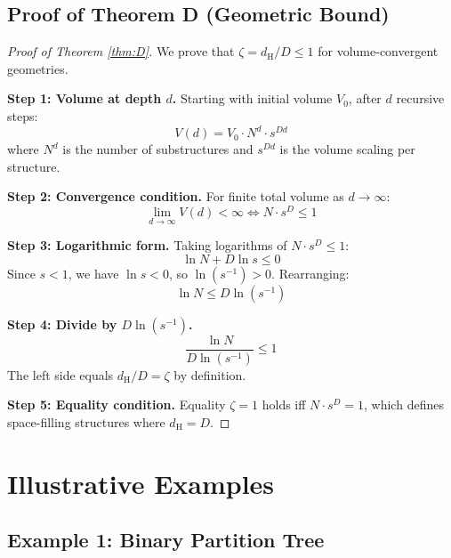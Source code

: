 \documentclass[11pt,a4paper]{article}
\theoremstyle{definition}
\theoremstyle{remark}
\newcommand{\dH}{d_{\mathrm{H}}}
\begin{document}
\subsection{Proof of Theorem D (Geometric Bound)}

\begin{proof}[Proof of Theorem \ref{thm:D}]
We prove that $\zeta = \dH/D \leq 1$ for volume-convergent geometries.

\textbf{Step 1: Volume at depth $d$.}
Starting with initial volume $V_0$, after $d$ recursive steps:
\begin{equation}
    V(d) = V_0 \cdot N^d \cdot s^{Dd}
\end{equation}
where $N^d$ is the number of substructures and $s^{Dd}$ is the volume scaling per structure.

\textbf{Step 2: Convergence condition.}
For finite total volume as $d \to \infty$:
\begin{equation}
    \lim_{d \to \infty} V(d) < \infty \iff N \cdot s^D \leq 1
\end{equation}

\textbf{Step 3: Logarithmic form.}
Taking logarithms of $N \cdot s^D \leq 1$:
\begin{equation}
    \ln N + D \ln s \leq 0
\end{equation}
Since $s < 1$, we have $\ln s < 0$, so $\ln(s^{-1}) > 0$. Rearranging:
\begin{equation}
    \ln N \leq D \ln(s^{-1})
\end{equation}

\textbf{Step 4: Divide by $D \ln(s^{-1})$.}
\begin{equation}
    \frac{\ln N}{D \ln(s^{-1})} \leq 1
\end{equation}
The left side equals $\dH/D = \zeta$ by definition.

\textbf{Step 5: Equality condition.}
Equality $\zeta = 1$ holds iff $N \cdot s^D = 1$, which defines space-filling structures where $\dH = D$.
\end{proof}

\section{Illustrative Examples}
\label{sec:examples}

\subsection{Example 1: Binary Partition Tree}
\end{document}
